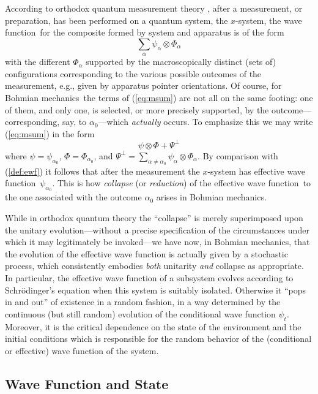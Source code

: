 \documentclass[12pt]{article}
\newcommand{\eq}[1]{(\ref{#1})}
\newcommand{\se}{Schr\"odinger's equation}
\newcommand{\BM}{Bohmian mechanics}
\newcommand{\wf}{wave function}
\newcommand{\ewf}{effective wave function}
\renewcommand{\a}{\alpha}
\begin{document}
According to orthodox quantum measurement theory \cite{vNe55, Boh51,
   Wig63, Wig83}, after a measurement, or preparation, has been
performed on a quantum system, the $x$-system, the \wf\ for the
composite formed by system and apparatus is of the form
\begin{equation}
\sum_\a{\psi_\a\otimes\Phi_\a}
\label{eq:msum}
\end{equation}
with the different $\Phi_\a$ supported by the macroscopically distinct
(sets of) configurations corresponding to the various possible
outcomes of the measurement, e.g., given by apparatus pointer
orientations. Of course, for \BM\ the terms of \eq{eq:msum} are not
all on the same footing: one of them, and only one, is selected, or
more precisely supported, by the outcome---corresponding, say, to
$\a_0$---which {\it actually\/} occurs. To emphasize this we may write
(\ref{eq:msum}) in the form
$$
\psi\otimes\Phi+\Psi^\perp
$$
where $\psi=\psi_{\a_0}$, $\Phi=\Phi_{\a_0}$, and
$\Psi^\perp=\sum_{\a\neq\a_0}{\psi_\a\otimes\Phi_\a}$.  By comparison
with (\ref{def:ewf}) it follows that after the measurement the
$x$-system has \ewf\ $\psi_{\a_0}$.  This is how {\it collapse} (or
{\it reduction}) of the \ewf\ to the one associated with the outcome
$\a_0$ arises in \BM.

While in orthodox quantum theory the ``collapse'' is merely
superimposed upon the unitary evolution---without a precise
specification of the circumstances under which it may legitimately be
invoked---we have now, in \BM{}, that the evolution of the \ewf{} is
actually given by a stochastic process, which consistently embodies
\emph{both} unitarity \emph{and} collapse as appropriate.  In
particular, the \ewf{} of a subsystem evolves according to \se{} when
this system is suitably isolated.  Otherwise it ``pops in and out'' of
existence in a random fashion, in a way determined by the continuous
(but still random) evolution of the conditional \wf{} $\psi_t$.
Moreover, it is the critical dependence on the state of the
environment and the initial conditions which is responsible for the
random behavior of the (conditional or effective) \wf{} of the system.

\subsection{Wave Function and State}
\label{sec:WFS}
\end{document}
